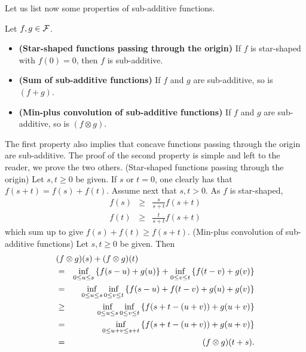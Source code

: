 Let us list now some properties of sub-additive functions.
\begin{theorem}
Let $f,g \in \mathcal F$.
\begin{itemize}
\item{\textbf{(Star-shaped functions passing through the origin)} If $f$ is star-shaped with $f(0) = 0$,
then $f$ is sub-additive.}
\item{\textbf{(Sum of sub-additive functions)} If $f$ and $g$ are sub-additive, so is $(f + g)$.}
\item{ \textbf{(Min-plus convolution of sub-additive functions)} If  $f$ and $g$ are sub-additive,
so is $(f \otimes g)$.}
\end{itemize}
\end{theorem}
The first property also implies that concave functions passing through the origin are sub-additive. The proof of the second property is simple and left to the reader, we prove the two others.
\pr (Star-shaped functions passing through the origin)
Let $s,t \geq 0$ be given. If $s$ or $t=0$, one clearly
 has that $f(s+t) = f(s) + f(t)$.
Assume next that $s, t > 0$. As $f$ is star-shaped,
\begin{eqnarray*}
f(s) &  \geq &  \frac{s}{s+t} f(s+t) \\
f(t) &  \geq &  \frac{t}{s+t} f(s+t)
\end{eqnarray*}
which sum up to give $ f(s) + f(t) \geq f(s+t) $.
\vspace{1ex}
\noindent
(Min-plus convolution of sub-additive functions)
Let $s,t \geq 0$ be given. Then
\begin{eqnarray*}
\lefteqn{(f \otimes g)(s) + (f \otimes g)(t)} \\
 & = & \inf_{0 \leq u
\leq s} \left\{ f(s -u) + g(u) \right\} + \inf_{0 \leq v \leq t}
\left\{ f(t -v) + g(v) \right\} \\
        & = & \inf_{0 \leq u \leq s} \inf_{0 \leq v \leq t} \left\{ f(s -u) + f(t-v) + g(u) + g(v) \right\} \\
        & \geq & \inf_{0 \leq u \leq s} \inf_{0 \leq v \leq t} \left\{ f(s+t -(u+v)) + g(u + v) \right\} \\
        & = & \inf_{0 \leq u+v \leq s+t} \left\{ f(s+t -(u+v)) + g(u + v) \right\} \\
        & = & (f \otimes g)(t + s).
\end{eqnarray*}
